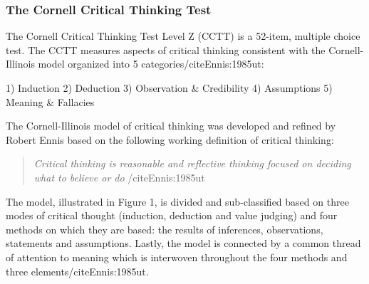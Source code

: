 \subsubsection{The Cornell Critical Thinking Test}

The Cornell Critical Thinking Test Level Z (CCTT) is a 52-item, multiple choice test. The CCTT measures aspects of critical thinking consistent with the Cornell-Illinois model organized into 5 categories/cite{Ennis:1985ut}:

1)	Induction
2)	Deduction
3)	Observation & Credibility
4)	Assumptions
5)	Meaning & Fallacies

The Cornell-Illinois model of critical thinking was developed and refined by Robert Ennis based on the following working definition of critical thinking:

\begin{quote}\textit{Critical thinking is reasonable and reflective thinking focused on deciding what to believe or do} /cite{Ennis:1985ut}\end{quote}

The model, illustrated in Figure 1, is divided and sub-classified based on three modes of critical thought (induction, deduction and value judging) and four methods on which they are based: the results of inferences, observations, statements and assumptions. Lastly, the model is connected by a common thread of attention to meaning which is interwoven throughout the four methods and three elements/cite{Ennis:1985ut}. 

